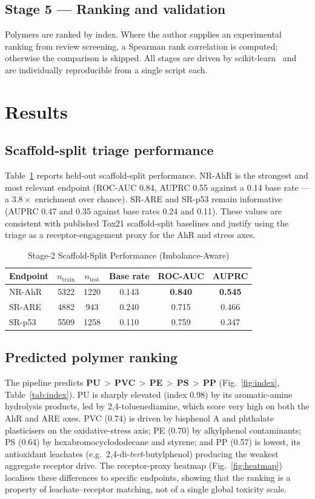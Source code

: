\documentclass[journal]{IEEEtran}
\begin{document}
\subsection{Stage 5 --- Ranking and validation}
Polymers are ranked by index. Where the author supplies an experimental ranking
from review screening, a Spearman rank correlation is computed; otherwise the
comparison is skipped. All stages are driven by scikit-learn~\cite{scikit} and are
individually reproducible from a single script each.

\section{Results}
\subsection{Scaffold-split triage performance}
Table~\ref{tab:metrics} reports held-out scaffold-split performance. NR-AhR is the
strongest and most relevant endpoint (ROC-AUC 0.84, AUPRC 0.55 against a 0.14 base
rate --- a $3.8\times$ enrichment over chance). SR-ARE and SR-p53 remain
informative (AUPRC 0.47 and 0.35 against base rates 0.24 and 0.11). These values
are consistent with published Tox21 scaffold-split baselines and justify using the
triage as a receptor-engagement proxy for the AhR and stress axes.

\begin{table}[!t]
\caption{Stage-2 Scaffold-Split Performance (Imbalance-Aware)}
\label{tab:metrics}
\centering
\begin{tabular}{lccccc}
\toprule
Endpoint & $n_{\mathrm{train}}$ & $n_{\mathrm{test}}$ & Base rate & ROC-AUC & AUPRC\\
\midrule
NR-AhR & 5322 & 1220 & 0.143 & \textbf{0.840} & \textbf{0.545}\\
SR-ARE & 4882 & 943  & 0.240 & 0.715 & 0.466\\
SR-p53 & 5509 & 1258 & 0.110 & 0.759 & 0.347\\
\bottomrule
\end{tabular}
\end{table}

\subsection{Predicted polymer ranking}
The pipeline predicts \textbf{PU\,$>$\,PVC\,$>$\,PE\,$>$\,PS\,$>$\,PP}
(Fig.~\ref{fig:index}, Table~\ref{tab:index}). PU is sharply elevated (index 0.98)
by its aromatic-amine hydrolysis products, led by 2,4-toluenediamine, which score
very high on both the AhR and ARE axes. PVC (0.74) is driven by bisphenol A and
phthalate plasticisers on the oxidative-stress axis; PE (0.70) by alkylphenol
contaminants; PS (0.64) by hexabromocyclododecane and styrene; and PP (0.57) is
lowest, its antioxidant leachates (e.g.\ 2,4-di-\emph{tert}-butylphenol) producing
the weakest aggregate receptor drive. The receptor-proxy heatmap
(Fig.~\ref{fig:heatmap}) localises these differences to specific endpoints,
showing that the ranking is a property of leachate--receptor matching, not of a
single global toxicity scale.
\end{document}
